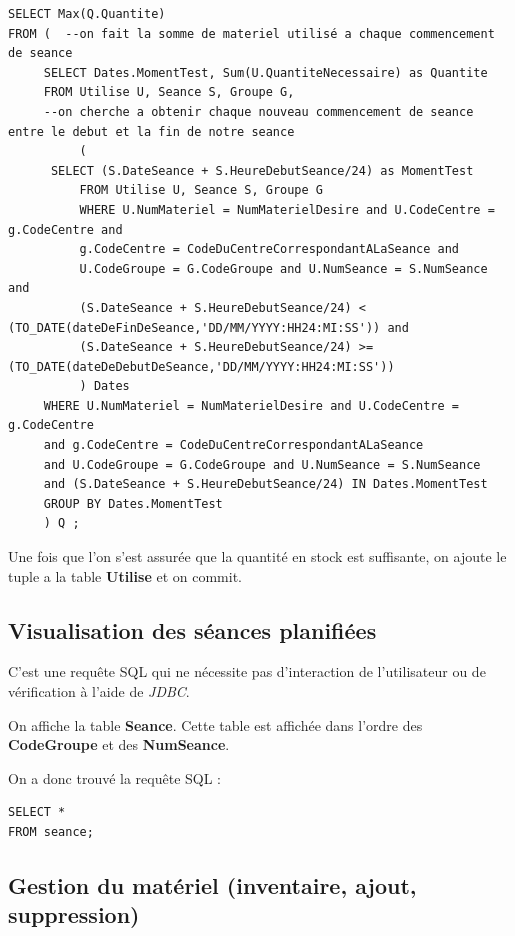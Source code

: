 \documentclass[10pt]{article}
\begin{document}
\begin{small}
\begin{verbatim}
SELECT Max(Q.Quantite)
FROM ( 	--on fait la somme de materiel utilisé a chaque commencement de seance
     SELECT Dates.MomentTest, Sum(U.QuantiteNecessaire) as Quantite
     FROM Utilise U, Seance S, Groupe G, 
     --on cherche a obtenir chaque nouveau commencement de seance entre le debut et la fin de notre seance
          (
	  SELECT (S.DateSeance + S.HeureDebutSeance/24) as MomentTest
     	  FROM Utilise U, Seance S, Groupe G
     	  WHERE U.NumMateriel = NumMaterielDesire and U.CodeCentre = g.CodeCentre and 
     	  g.CodeCentre = CodeDuCentreCorrespondantALaSeance and
     	  U.CodeGroupe = G.CodeGroupe and U.NumSeance = S.NumSeance and 
     	  (S.DateSeance + S.HeureDebutSeance/24) < (TO_DATE(dateDeFinDeSeance,'DD/MM/YYYY:HH24:MI:SS')) and 
     	  (S.DateSeance + S.HeureDebutSeance/24) >= (TO_DATE(dateDeDebutDeSeance,'DD/MM/YYYY:HH24:MI:SS'))
     	  ) Dates
     WHERE U.NumMateriel = NumMaterielDesire and U.CodeCentre = g.CodeCentre 
     and g.CodeCentre = CodeDuCentreCorrespondantALaSeance
     and U.CodeGroupe = G.CodeGroupe and U.NumSeance = S.NumSeance 
     and (S.DateSeance + S.HeureDebutSeance/24) IN Dates.MomentTest
     GROUP BY Dates.MomentTest
     ) Q ;
\end{verbatim}
\end{small}

Une fois que l'on s'est assurée que la quantité en stock est suffisante, on ajoute le tuple a la table \textbf{Utilise} et
on commit.

\subsection{Visualisation des séances planifiées}

C'est une requête SQL qui ne nécessite pas d'interaction de l'utilisateur ou de vérification à l'aide de \emph{JDBC}.

On affiche la table \textbf{Seance}. Cette table est affichée dans l'ordre des \textbf{CodeGroupe} et des \textbf{NumSeance}.

On a donc trouvé la requête SQL :
\begin{small}
\begin{verbatim}
SELECT *
FROM seance;
\end{verbatim}
\end{small}

\subsection{Gestion du matériel (inventaire, ajout, suppression)}
\end{document}
